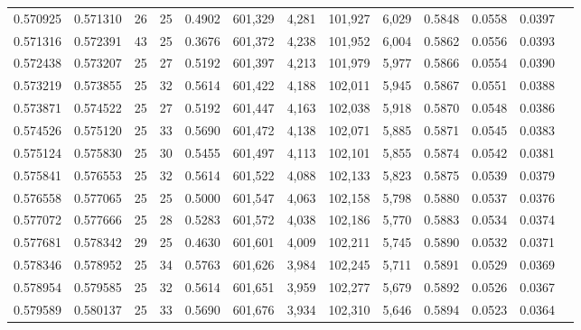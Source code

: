 \begin{tabular}{rrrrrrrrrrrrr}
0.570925 & 0.571310 &    26 &  25 &                                     0.4902 & 601,329 &   4,281 & 101,927 &   6,029 & 0.5848 & 0.0558 & 0.0397 \\
0.571316 & 0.572391 &    43 &  25 &                                     0.3676 & 601,372 &   4,238 & 101,952 &   6,004 & 0.5862 & 0.0556 & 0.0393 \\
0.572438 & 0.573207 &    25 &  27 &                                     0.5192 & 601,397 &   4,213 & 101,979 &   5,977 & 0.5866 & 0.0554 & 0.0390 \\
0.573219 & 0.573855 &    25 &  32 &                                     0.5614 & 601,422 &   4,188 & 102,011 &   5,945 & 0.5867 & 0.0551 & 0.0388 \\
0.573871 & 0.574522 &    25 &  27 &                                     0.5192 & 601,447 &   4,163 & 102,038 &   5,918 & 0.5870 & 0.0548 & 0.0386 \\
0.574526 & 0.575120 &    25 &  33 &                                     0.5690 & 601,472 &   4,138 & 102,071 &   5,885 & 0.5871 & 0.0545 & 0.0383 \\
0.575124 & 0.575830 &    25 &  30 &                                     0.5455 & 601,497 &   4,113 & 102,101 &   5,855 & 0.5874 & 0.0542 & 0.0381 \\
0.575841 & 0.576553 &    25 &  32 &                                     0.5614 & 601,522 &   4,088 & 102,133 &   5,823 & 0.5875 & 0.0539 & 0.0379 \\
0.576558 & 0.577065 &    25 &  25 &                                     0.5000 & 601,547 &   4,063 & 102,158 &   5,798 & 0.5880 & 0.0537 & 0.0376 \\
0.577072 & 0.577666 &    25 &  28 &                                     0.5283 & 601,572 &   4,038 & 102,186 &   5,770 & 0.5883 & 0.0534 & 0.0374 \\
0.577681 & 0.578342 &    29 &  25 &                                     0.4630 & 601,601 &   4,009 & 102,211 &   5,745 & 0.5890 & 0.0532 & 0.0371 \\
0.578346 & 0.578952 &    25 &  34 &                                     0.5763 & 601,626 &   3,984 & 102,245 &   5,711 & 0.5891 & 0.0529 & 0.0369 \\
0.578954 & 0.579585 &    25 &  32 &                                     0.5614 & 601,651 &   3,959 & 102,277 &   5,679 & 0.5892 & 0.0526 & 0.0367 \\
0.579589 & 0.580137 &    25 &  33 &                                     0.5690 & 601,676 &   3,934 & 102,310 &   5,646 & 0.5894 & 0.0523 & 0.0364 \\

\end{tabular}
